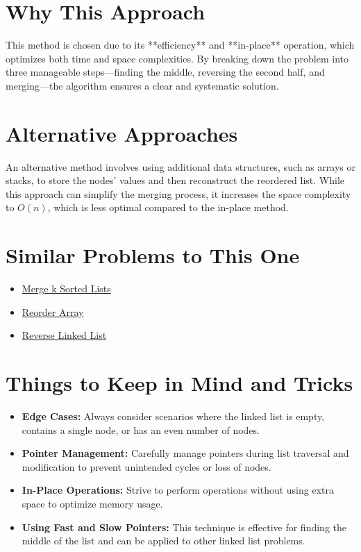 \section*{Why This Approach}
This method is chosen due to its **efficiency** and **in-place** operation, which optimizes both time and space complexities. By breaking down the problem into three manageable steps—finding the middle, reversing the second half, and merging—the algorithm ensures a clear and systematic solution.

\section*{Alternative Approaches}
An alternative method involves using additional data structures, such as arrays or stacks, to store the nodes' values and then reconstruct the reordered list. While this approach can simplify the merging process, it increases the space complexity to \(O(n)\), which is less optimal compared to the in-place method.

\section*{Similar Problems to This One}
\begin{itemize}
    \item \hyperref[problem:merge_k_sorted_lists]{Merge k Sorted Lists}
    \item \hyperref[problem:reorder_array]{Reorder Array}
    \item \hyperref[problem:reverse_linked_list]{Reverse Linked List}
\end{itemize}

\section*{Things to Keep in Mind and Tricks}
\begin{itemize}
    \item \textbf{Edge Cases:} Always consider scenarios where the linked list is empty, contains a single node, or has an even number of nodes.
    \item \textbf{Pointer Management:} Carefully manage pointers during list traversal and modification to prevent unintended cycles or loss of nodes.
    \item \textbf{In-Place Operations:} Strive to perform operations without using extra space to optimize memory usage.
    \item \textbf{Using Fast and Slow Pointers:} This technique is effective for finding the middle of the list and can be applied to other linked list problems.
\end{itemize}


